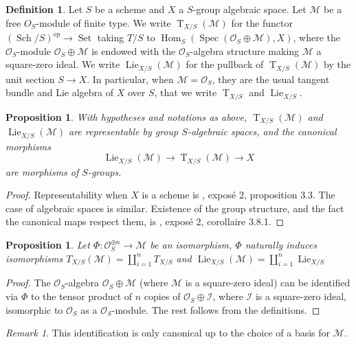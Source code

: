 \documentclass{article}
\renewcommand{\O}{\mathcal{O}}
\DeclareMathOperator{\spec}{Spec}
\DeclareMathOperator{\sch}{Sch}
\DeclareMathOperator{\set}{Set}
\DeclareMathOperator{\Hom}{Hom}
\DeclareMathOperator{\lie}{Lie}
\DeclareMathOperator{\T}{T}
\newtheorem{prop}[thm]{Proposition}
\theoremstyle{definition}
\newtheorem{defi}[thm]{Definition}
\theoremstyle{remark}
\newtheorem{rem}{Remark}[thm]
\begin{document}
\begin{defi}
Let $S$ be a scheme and $X$ a $S$-group algebraic space. Let $\mathcal{M}$ be a free $O_S$-module of finite type. We write $\T_{X/S}(\mathcal{M})$ for the functor $(\sch/S)^{op}\longrightarrow \set$ taking $T/S$ to $\Hom_S(\spec(\O_S\oplus\mathcal{M}),X)$, where the $\O_S$-module $\O_S\oplus\mathcal{M}$ is endowed with the $\O_S$-algebra structure making $\mathcal{M}$ a square-zero ideal. We write $\lie_{X/S}(\mathcal{M})$ for the pullback of $\T_{X/S}(\mathcal{M})$ by the unit section $S\longrightarrow X$. In particular, when $\mathcal{M}=\O_S$, they are the usual tangent bundle and Lie algebra of $X$ over $S$, that we write $\T_{X/S}$ and $\lie_{X/S}$.
\end{defi}

\begin{prop}
With hypotheses and notations as above, $\T_{X/S}(\mathcal{M})$ and $\lie_{X/S}(\mathcal{M})$ are representable by group $S$-algebraic spaces, and the canonical morphisms
\[
\lie_{X/S}(\mathcal{M})\longrightarrow\T_{X/S}(\mathcal{M})\longrightarrow X
\]
are morphisms of $S$-groups.
\end{prop}

\begin{proof}
Representability when $X$ is a scheme is \cite{SGA3}, exposé 2, proposition 3.3. The case of algebraic spaces is similar. Existence of the group structure, and the fact the canonical maps respect them, is \cite{SGA3}, exposé 2, corollaire 3.8.1.
\end{proof}

\begin{prop}
Let $\Phi\colon \O_S^{\oplus n}\longrightarrow\mathcal{M}$ be an isomorphism, $\Phi$ naturally induces isomorphisms $T_{X/S}(\mathcal{M})=\coprod\limits_{i=1}^n T_{X/S}$ and $\lie_{X/S}(\mathcal{M})=\coprod\limits_{i=1}^n \lie_{X/S}$
\end{prop}

\begin{proof}
The $\O_S$-algebra $\O_S\oplus\mathcal{M}$ (where $\mathcal{M}$ is a square-zero ideal) can be identified via $\Phi$ to the tensor product of $n$ copies of $\O_S\oplus\mathcal{I}$, where $\mathcal{I}$ is a square-zero ideal, isomorphic to $\O_S$ as a $\O_S$-module. The rest follows from the definitions.
\end{proof}

\begin{rem}
This identification is only canonical up to the choice of a basis for $\mathcal{M}$.
\end{rem}
\end{document}
